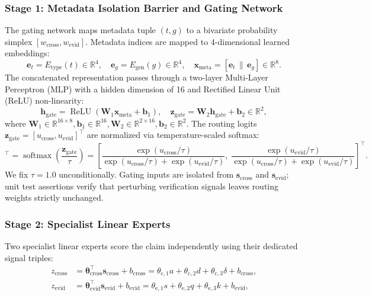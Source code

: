 \documentclass[pdflatex,sn-mathphys,Numbered]{sn-jnl}
\begin{document}
\subsubsection{Stage 1: Metadata Isolation Barrier and Gating Network}
The gating network maps metadata tuple $(t, g)$ to a bivariate probability simplex $[w_{\mathrm{cross}}, w_{\mathrm{evid}}]$. Metadata indices are mapped to 4-dimensional learned embeddings:
\begin{equation}
\mathbf{e}_t = E_{\mathrm{type}}(t) \in \mathbb{R}^4, \quad \mathbf{e}_g = E_{\mathrm{gen}}(g) \in \mathbb{R}^4, \quad \mathbf{x}_{\mathrm{meta}} = [\mathbf{e}_t \,\|\, \mathbf{e}_g] \in \mathbb{R}^8.
\end{equation}
The concatenated representation passes through a two-layer Multi-Layer Perceptron (MLP) with a hidden dimension of 16 and Rectified Linear Unit (ReLU) non-linearity:
\begin{equation}
\mathbf{h}_{\mathrm{gate}} = \operatorname{ReLU}(\mathbf{W}_1 \mathbf{x}_{\mathrm{meta}} + \mathbf{b}_1), \quad \mathbf{z}_{\mathrm{gate}} = \mathbf{W}_2 \mathbf{h}_{\mathrm{gate}} + \mathbf{b}_2 \in \mathbb{R}^2,
\end{equation}
where $\mathbf{W}_1 \in \mathbb{R}^{16 \times 8}, \mathbf{b}_1 \in \mathbb{R}^{16}, \mathbf{W}_2 \in \mathbb{R}^{2 \times 16}, \mathbf{b}_2 \in \mathbb{R}^2$. The routing logits $\mathbf{z}_{\mathrm{gate}} = [u_{\mathrm{cross}}, u_{\mathrm{evid}}]^{\top}$ are normalized via temperature-scaled softmax:
\begin{equation}
[w_{\mathrm{cross}}, w_{\mathrm{evid}}]^{\top} = \operatorname{softmax}\left(\frac{\mathbf{z}_{\mathrm{gate}}}{\tau}\right) = \left[ \frac{\exp(u_{\mathrm{cross}}/\tau)}{\exp(u_{\mathrm{cross}}/\tau) + \exp(u_{\mathrm{evid}}/\tau)}, \; \frac{\exp(u_{\mathrm{evid}}/\tau)}{\exp(u_{\mathrm{cross}}/\tau) + \exp(u_{\mathrm{evid}}/\tau)} \right]^{\top}.
\end{equation}
We fix $\tau = 1.0$ unconditionally. Gating inputs are isolated from $\mathbf{s}_{\mathrm{cross}}$ and $\mathbf{s}_{\mathrm{evid}}$; unit test assertions verify that perturbing verification signals leaves routing weights strictly unchanged.

\subsubsection{Stage 2: Specialist Linear Experts}
Two specialist linear experts score the claim independently using their dedicated signal triples:
\begin{align}
z_{\mathrm{cross}} &= \boldsymbol{\theta}_{\mathrm{cross}}^{\top}\mathbf{s}_{\mathrm{cross}} + b_{\mathrm{cross}} = \theta_{\mathrm{c},1} a + \theta_{\mathrm{c},2} d + \theta_{\mathrm{c},3} \delta + b_{\mathrm{cross}}, \\
z_{\mathrm{evid}} &= \boldsymbol{\theta}_{\mathrm{evid}}^{\top}\mathbf{s}_{\mathrm{evid}} + b_{\mathrm{evid}} = \theta_{\mathrm{e},1} s + \theta_{\mathrm{e},2} q + \theta_{\mathrm{e},3} k + b_{\mathrm{evid}},
\end{align}
\end{document}
